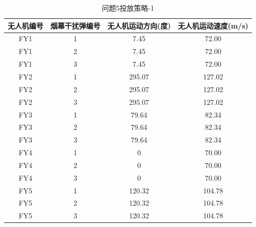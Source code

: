 \documentclass[../main.tex]{subfiles}
\begin{document}
\begin{table}[H]
\caption{问题5投放策略-1}
\label{tab:001} 
\centering
\begin{small}
\begin{tabular}{cccc}
\toprule[1.5pt]
无人机编号 & 烟幕干扰弹编号 & 无人机运动方向(度) & 无人机运动速度(m/s)  \\  
\midrule[1pt]
FY1        & 1              & 7.45               & 72.00                \\               
FY1        & 2              & 7.45               & 72.00                \\               
FY1        & 3              & 7.45               & 72.00                \\                
FY2        & 1              & 295.07             & 127.02               \\                
FY2        & 2              & 295.07             & 127.02               \\               
FY2        & 3              & 295.07             & 127.02               \\               
FY3        & 1              & 79.64              & 82.34                \\               
FY3        & 2              & 79.64              & 82.34                \\                
FY3        & 3              & 79.64              & 82.34                \\                
FY4        & 1              & 0                  & 70.00                \\                
FY4        & 2              & 0                  & 70.00                \\               
FY4        & 3              & 0                  & 70.00                \\               
FY5        & 1              & 120.32             & 104.78               \\               
FY5        & 2              & 120.32             & 104.78               \\                
FY5        & 3              & 120.32             & 104.78               \\               
\bottomrule[1.5pt]
\end{tabular}
\end{small}
\end{table}
\end{document}
